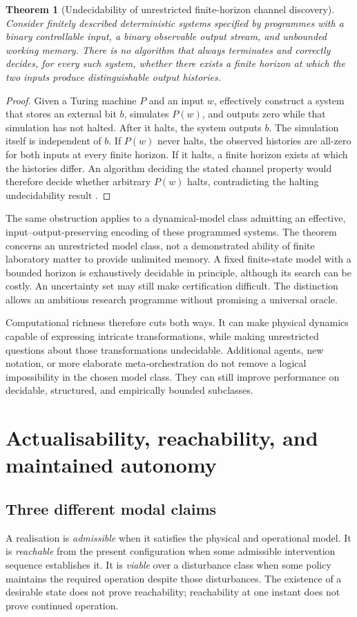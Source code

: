 \documentclass[11pt,a4paper]{article}
\newtheorem{theorem}{Theorem}[section]
\theoremstyle{definition}
\theoremstyle{remark}
\begin{document}
\begin{theorem}[Undecidability of unrestricted finite-horizon channel discovery]\label{thm:undecidable}
Consider finitely described deterministic systems specified by programmes with a binary controllable input, a binary observable output stream, and unbounded working memory. There is no algorithm that always terminates and correctly decides, for every such system, whether there exists a finite horizon at which the two inputs produce distinguishable output histories.
\end{theorem}
\begin{proof}
Given a Turing machine $P$ and an input $w$, effectively construct a system that stores an external bit $b$, simulates $P(w)$, and outputs zero while that simulation has not halted. After it halts, the system outputs $b$. The simulation itself is independent of $b$. If $P(w)$ never halts, the observed histories are all-zero for both inputs at every finite horizon. If it halts, a finite horizon exists at which the histories differ. An algorithm deciding the stated channel property would therefore decide whether arbitrary $P(w)$ halts, contradicting the halting undecidability result \citep{turing}.
\end{proof}
The same obstruction applies to a dynamical-model class admitting an effective, input--output-preserving encoding of these programmed systems. The theorem concerns an unrestricted model class, not a demonstrated ability of finite laboratory matter to provide unlimited memory. A fixed finite-state model with a bounded horizon is exhaustively decidable in principle, although its search can be costly. An uncertainty set may still make certification difficult. The distinction allows an ambitious research programme without promising a universal oracle.

Computational richness therefore cuts both ways. It can make physical dynamics capable of expressing intricate transformations, while making unrestricted questions about those transformations undecidable. Additional agents, new notation, or more elaborate meta-orchestration do not remove a logical impossibility in the chosen model class. They can still improve performance on decidable, structured, and empirically bounded subclasses.

\section{Actualisability, reachability, and maintained autonomy}\label{sec:viability}
\subsection{Three different modal claims}
A realisation is \emph{admissible} when it satisfies the physical and operational model. It is \emph{reachable} from the present configuration when some admissible intervention sequence establishes it. It is \emph{viable} over a disturbance class when some policy maintains the required operation despite those disturbances. The existence of a desirable state does not prove reachability; reachability at one instant does not prove continued operation.
\end{document}
